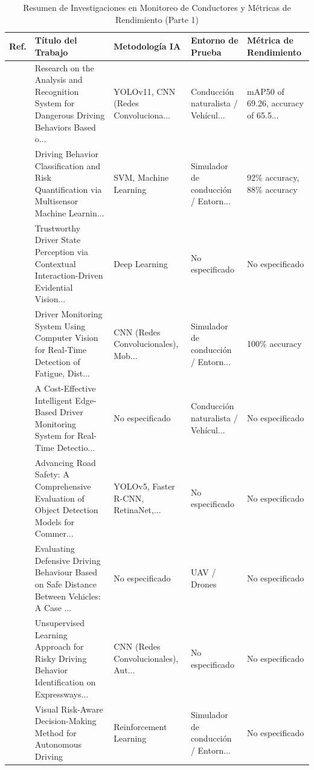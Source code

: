 \begin{table}[htbp]
\centering
\renewcommand{\arraystretch}{1.1}
\caption{Resumen de Investigaciones en Monitoreo de Conductores y Métricas de Rendimiento (Parte 1)}
\label{tab:articulos_conductores_1}
\footnotesize
\begin{tabular}{cp{7.5cm}p{2.8cm}p{2.8cm}p{2.8cm}}
\toprule
\textbf{Ref.} & \textbf{Título del Trabajo} & \textbf{Metodología IA} & \textbf{Entorno de Prueba} & \textbf{Métrica de Rendimiento} \\
\midrule
\cite{liu2026research} & Research on the Analysis and Recognition System for Dangerous Driving Behaviors Based o... & YOLOv11, CNN (Redes Convoluciona... & Conducción naturalista / Vehícul... & mAP50 of 69.26, accuracy of 65.5... \\
\cite{abarghooei2026driving} & Driving Behavior Classification and Risk Quantification via Multisensor Machine Learnin... & SVM, Machine Learning & Simulador de conducción / Entorn... & 92\% accuracy, 88\% accuracy \\
\cite{hu2026trustworthy} & Trustworthy Driver State Perception via Contextual Interaction-Driven Evidential Vision... & Deep Learning & No especificado & No especificado \\
\cite{zambrano2026monitoring} & Driver Monitoring System Using Computer Vision for Real-Time Detection of Fatigue, Dist... & CNN (Redes Convolucionales), Mob... & Simulador de conducción / Entorn... & 100\% accuracy \\
\cite{rahman2026costeffective} & A Cost-Effective Intelligent Edge-Based Driver Monitoring System for Real-Time Detectio... & No especificado & Conducción naturalista / Vehícul... & No especificado \\
\cite{zia2025advancing} & Advancing Road Safety: A Comprehensive Evaluation of Object Detection Models for Commer... & YOLOv5, Faster R-CNN, RetinaNet,... & No especificado & No especificado \\
\cite{bhavsar2025evaluating} & Evaluating Defensive Driving Behaviour Based on Safe Distance Between Vehicles: A Case ... & No especificado & UAV / Drones & No especificado \\
\cite{kim2025unsupervised} & Unsupervised Learning Approach for Risky Driving Behavior Identification on Expressways... & CNN (Redes Convolucionales), Aut... & No especificado & No especificado \\
\cite{wu2025visual} & Visual Risk-Aware Decision-Making Method for Autonomous Driving & Reinforcement Learning & Simulador de conducción / Entorn... & No especificado \\

\end{tabular}
\end{table}
